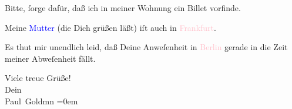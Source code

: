 \pstart
           Bitte, ſorge dafür, daß ich in meiner Wohnung ein Billet vorfinde.\pend
           
\pstart
           Meine \textcolor{blue}{Mutter}{}\ledrightnote{{$\rightarrow$}\textcolor{blue}{Clementine Goldmann}} (die Dich
               grüßen läßt) iſt auch in \textcolor{pink}{Frankfurt}{}\ledrightnote{\textcolor{pink}{Frankfurt am Main}}.\pend
           
\pstart
           Es thut mir unendlich leid, daß Deine  Anweſenheit
               in \textcolor{pink}{Berlin}{}\ledrightnote{\textcolor{pink}{Berlin}} gerade in die Zeit meiner Abweſenheit
               fällt.\pend
           
\pstart
           Viele treue Grüße! {\\[\baselineskip]}Dein {\\[\baselineskip]}\spacefill\mbox{Paul Goldmn}\pend
           \leftskip=0em{}\endnumbering{}
\begin{anhang}
\end{anhang}
      